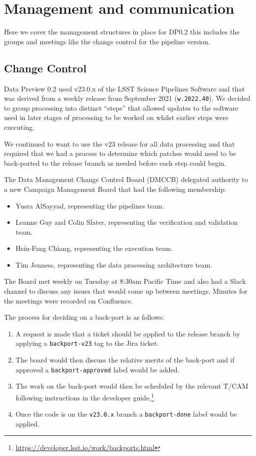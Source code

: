 \section{Management and communication} \label{sec:management}

Here we cover the management structures in place for DP0.2 this includes the groups and meetings like the change control for the pipeline version.

\subsection{Change Control}

Data Preview 0.2 used v23.0.x of the LSST Science Pipelines Software and that was derived from a weekly release from September 2021 (\texttt{w.2022.40}).
We decided to group processing into distinct ``steps'' that allowed updates to the software used in later stages of processing to be worked on whilst earlier steps were executing.

We continued to want to use the v23 release for all data processing and that required that we had a process to determine which patches would need to be back-ported to the release branch as needed before each step could begin.

The Data Management Change Control Board (DMCCB) delegated authority to a new Campaign Management Board that had the following membership:

\begin{itemize}
\item Yusra AlSayyad, representing the pipelines team.
\item Leanne Guy and Colin Slater, representing the verification and validation team.
\item Hsin-Fang Chiang, representing the execution team.
\item Tim Jenness, representing the data processing architecture team.
\end{itemize}

The Board met weekly on Tuesday at 8:30am Pacific Time and also had a Slack channel to discuss any issues that would come up between meetings.
Minutes for the meetings were recorded on Confluence.

The process for deciding on a back-port is as follows:

\begin{enumerate}

\item A request is made that a ticket should be applied to the release branch by applying a \texttt{backport-v23} tag to the Jira ticket.
\item The board would then discuss the relative merits of the back-port and if approved a \texttt{backport-approved} label would be added.
\item The work on the back-port would then be scheduled by the relevant T/CAM following instructions in the developer guide.\footnote{\url{https://developer.lsst.io/work/backports.html}}
\item Once the code is on the \texttt{v23.0.x} branch a \texttt{backport-done} label would be applied.

\end{enumerate}

